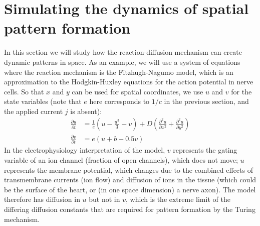 \documentclass [11pt]{article}
\numberwithin{exercise}{section}
\begin{document}
\section{Simulating the dynamics of spatial pattern formation} 

In this section we will study how the reaction-diffusion mechanism can create dynamic patterns
in space. As an example, we will use a system of equations where the reaction mechanism is the
Fitzhugh-Nagumo model, which is an approximation to the Hodgkin-Huxley equations for the
action potential in nerve cells. So that $x$ and $y$ can be used for spatial coordinates, we use
$u$ and $v$ for the state variables (note that $e$ here corresponds to $1/c$ in the previous
section, and the applied current $j$ is absent): 
\begin{equation}
\begin{aligned}
\frac{\partial u}{\partial t} & = \frac{1}{e}(u-\frac{u^3}{3} - v) +
D \left ( \frac{\partial^2 u}{\partial x^2} + \frac{\partial^2 u}{\partial y^2} \right )\\
\frac{\partial v}{\partial t} & = e(u + b - 0.5v)
\end{aligned} 
\label{sfnmodel} 
\end{equation}
In the electrophysiology interpretation of the model, $v$ represents the gating variable of an ion channel 
(fraction of open channels), which does not move; $u$ represents the membrane potential, which changes due 
to the combined effects of transmembrane currents (ion flow) and diffusion of ions in the tissue (which could 
be the surface of the heart, or (in one space dimension) a nerve axon). The model therefore has diffusion in $u$ but 
not in $v$, which is the extreme limit of the differing diffusion constants that are required for pattern formation 
by the Turing mechanism. 
\end{document}
